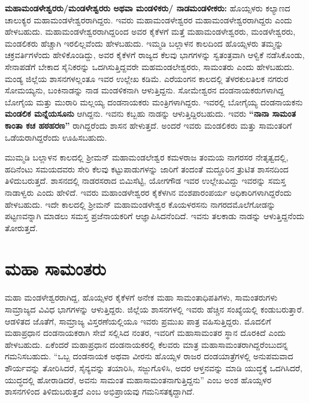 \textbf{ಮಹಾಮಂಡಳೇಶ್ವರರು/ಮಂಡಳೇಶ್ವರರು ಅಥವಾ ಮಂಡಳಿಕರು/ ನಾಡಮಂಡಳೀಕರು:} ಹೊಯ್ಸಳರು ಕಲ್ಯಾಣದ ಚಾಲುಕ್ಯರ ಮಹಾಮಂಡಳೇಶ್ವರರಾಗಿದ್ದರು. ಇವರು ಮಹಾಮಂಡಳೇಶ್ವರರ ಮಹಾಮಂಡಳೇಶ್ವರರಾಗಿದ್ದರು ಎಂದು ಹೇಳಬಹುದು. ಮಹಾಮಂಡಳೇಶ್ವರರಾಗಿದ್ದರಿಂದ ಅವರ ಕೈಕೆಳಗೆ ಮತ್ತೆ ಮಹಾಮಂಡಳೇಶ್ವರರು, ಮಂಡಳೇಶ್ವರರು, ಮಂಡಲಿಕರು ಹೆಚ್ಚಾಗಿ ಇರಲಿಲ್ಲವೆಂದು ಹೇಳಬಹುದು. ಇಮ್ಮಡಿ ಬಲ್ಲಾಳನ ಕಾಲದಿಂದ ಹೊಯ್ಸಳರು ತಮ್ಮನ್ನು ಚಕ್ರವರ್ತಿ\-ಗಳೆಂದು ಹೇಳಿಕೊಂಡಿದ್ದು, ಅವರ ಕೈಕೆಳಗೆ ರಾಜ್ಯದ ಕೆಲವು ಭಾಗಗಳನ್ನು ಸ್ವತಂತ್ರವಾಗಿ ಆಳ್ವಿಕೆ ನಡೆಸಿಕೊಂಡು, ಸೇನಾಪಡೆಗೆ ಬೇಕಾದ ಸೈನಿಕರನ್ನು ಒದಗಿಸುತ್ತಿದ್ದವರೇ ಮಹಮಂಡಲೇಶ್ವರರು, ಸಾಮಂತರು ಎಂದು ಹೇಳಬಹುದು. ಮಂಡ್ಯ ಜಿಲ್ಲೆಯ ಶಾಸನಗಳಲ್ಲಂತೂ ಇವರ ಉಲ್ಲೇಖ ಕಡಿಮೆ. ಎರೆಯಂಗನ ಕಾಲದಲ್ಲಿ ತೆಳರಕುಲತಿಲಕ ನಗರುರ ಸೋಮಯ್ಯನು, ಬಂಕಿನಾಡನ್ನು ನಾಡ ಮಂಡಳಿಕನಾಗಿ ಆಳುತ್ತಿದ್ದನು. ಸೋಮೇಶ್ವರನ ದಂಡನಾಯಕರುಗಳಾಗಿದ್ದ ಬೋಗೈಯ ಮತ್ತು ಮುರಾರಿ ಮಲ್ಲಯ್ಯ ದಂಡನಾಯಕರು ಮಂತ್ರಿಗಳಾಗಿದ್ದರು. ಇವರಲ್ಲಿ ಬೋಗೈಯ್ಯ ದಂಡನಾಯಕನು \textbf{ಮಂಡಲಿಕ ಮನ್ನೆಯಸೂನು} ಆಗಿದ್ದನು. ಇವನು ಕಬ್ಬಹು ನಾಡನ್ನು ಆಳುತ್ತಿದ್ದಿರಬಹುದು. ಇವರು \textbf{“ನಾನಾ ಸಾಮಂತ ಕಾಂತಾ ಕಚ ಹಠಹರಣ”} ರಾಗಿದ್ದರೆಂದು ಶಾಸನ ಹೇಳುತ್ತದೆ. ಅಂದರೆ ಇವರು ಮಂಡಲಿಕರು ಮತ್ತು ಸಾಮಂತರಿಗೆ ಒಡೆಯರಾಗಿದ್ದರೆಂದು ಊಹಿಸಬಹುದು.

\newpage

ಮುಮ್ಮಡಿ ಬಲ್ಲಾಳನ ಕಾಲದಲ್ಲಿ ಶ‍್ರೀಮನ್​ ಮಹಾಮಂಡಲೇಶ್ವರ ಕಮಳರಾಜ ತಂಮಯ ನಾಗರಸರ ನೇತೃತ್ವದಲ್ಲಿ, ಹದಿನೆಂಟು ಸಮಯದವರು ಸೇರಿ ಕೆಲವು ಕಟ್ಟುಪಾಡುಗಳನ್ನು ಜಾರಿಗೆ ತಂದಂತೆ ಮದ್ದೂರಿನ ತ್ರುಟಿತ ಶಾಸನದಿಂದ ತಿಳಿದುಬರುತ್ತದೆ. ಶಾಸನದಲ್ಲಿ ನಾಡರಸರಾದ ಬಿಮಿಸೆಟ್ಟಿ, ಯೋಗಗೌಡ ಇವರ ಉಲ್ಲೇಖವಿದ್ದು ಇವರನ್ನು ಸಮಸ್ತ ನಾಡಾಳ್ವರು ಎಂದು ಹೇಳಿದೆ. ಇವರು ಮಹಾಂಡಳೇಶ್ವರರ ಕೈಕೆಳಗಿನ ವಂಶಪಾರಂಪರ್ಯ ಅಧಿಕಾರಿಗಳಾಗಿದ್ದರೆಂದು ಹೇಳಬಹುದು. ಇದೇ ಕಾಲದಲ್ಲಿ ಶ‍್ರೀಮನ್​ ಮಹಾಮಂಡಳೇಶ್ವರ ಕೊಯಳರಸನು ನಾಗರದಮೊಲೆಗೋಡನ್ನು ಪಟ್ಟಣವನ್ನಾಗಿ ಮಾಡಲು ಸಮಸ್ತ ಪ್ರಜೆನಾಯಕರಿಗೆ ಆಜ್ಞಾಪಿಸಿದನೆಂದಿದೆ. ಇವನು ತಲಕಾಡು ನಾಡನ್ನು ಆಳುತ್ತಿದ್ದನೆಂದು ತೋರುತ್ತದೆ.

\section{ಮಹಾ ಸಾಮಂತರು}

ಮಹಾ ಮಂಡಳೇಶ್ವರರಾಗಿದ್ದ, ಹೊಯ್ಸಳರ ಕೈಕೆಳಗೆ ಅನೇಕ ಮಹಾ ಸಾಮಂತಾಧಿಪತಿಗಳು, ಸಾಮಂತರುಗಳು ಸಾಮ್ರಾಜ್ಯದ ವಿವಿಧ ಭಾಗಗಳನ್ನು ಆಳುತ್ತಿದ್ದರು. ಜಿಲ್ಲೆಯ ಶಾಸನಗಳಲ್ಲಿ ಇವರು ಹೆಚ್ಚಿನ ಸಂಖ್ಯೆಯಲ್ಲಿ ಕಂಡುಬರುತ್ತಾರೆ. ಆಡಳಿತದ ಜೊತೆಗೆ, ಸಾಮ್ರಾಜ್ಯ ವಿಸ್ತರಣೆಯಲ್ಲಿಯೂ ಇವರು ಪ್ರಮುಖ ಪಾತ್ರ ವಹಿಸುತ್ತಿದ್ದರು. ಮೊದಲಿಗೆ ಮಹಾಪ್ರಧಾನ ದಂಡನಾಯಕರಾಗಿ ಸೇವೆ ಸಲ್ಲಿಸಿದ ನಂತರ, ಇವರಿಗೆ ಮಹಾಸಾಮಂತರ ಸ್ಥಾನ ದೊರಕಿದೆ ಎಂದು ಹೇಳಬಹುದು. ಏಕೆಂದರೆ ಮಹಾಪ್ರಧಾನ ದಂಡನಾಯಕರಲ್ಲಿ ಕೆಲವರು ಮಾತ್ರ ಮಹಾಸಾಮಂತರಾಗಿದ್ದರೆಂಬುದನ್ನ ಗಮನಿಸಬಹುದು. “ಒಬ್ಬ ದಂಡನಾಯಕ ಅಥವಾ ವೀರನು ಹೊಯ್ಸಳ ರಾಜರ ದಂಡಯಾತ್ರೆಗಳಲ್ಲಿ ಅನುಪಮವಾದ ಶೌರ್ಯವನ್ನು ತೋರಿಸಿದರೆ, ಸೈನ್ಯವನ್ನು ತಯಾರಿಸಿ, ಸಜ್ಜುಗೊಳಿಸಿ, ಅದರ ಆಳ್ತನವನ್ನು ಮಾಡಿ ಯುದ್ಧಕ್ಕೆ ಒದಗಿಸಿದರೆ, ಯುದ್ಧದಲ್ಲಿ ಹೋರಾಡಿದರೆ, ಅವನು ಸಾಮಂತ ಮಹಾಸಾಮಂತನಾಗುತ್ತಿದ್ದನು” ಎಂಬ ಅಂಶ ಹೊಯ್ಸಳರ ಶಾಸನಗಳಿಂದ ತಿಳಿದುಬರುತ್ತದೆ ಎಂಬ ಅಭಿಪ್ರಾಯವು ಗಮನಿಸತಕ್ಕದ್ದಾಗಿದೆ.

